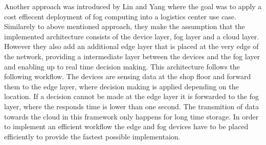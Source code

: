 Another approach was introduced by Lin and Yang where the goal was to apply a cost effiecent deployment of fog computing into a logistics center use case. Similarely to above mentioned approach, they make the assumption that the implemented architecture  consists of the device layer, fog layer and a cloud layer. However they also add an additional edge layer that is placed at the very edge of the network, providing a intermediate layer between the devices and the fog layer and enabling up to real time decision making. This architecture follows the following workflow. The devices are sensing data at the shop floor and forward them to the edge layer, where decision making is applied depending on the location. If a decision cannot be made at the edge layer it is forwarded to the fog layer, where the responds time is lower than one second. The transmition of data towards the cloud in this framework only happens for long time storage. In order to implement an efficient workflow the edge and fog devices have to be placed efficiently to provide the fastest possible implementaion. 

